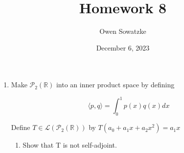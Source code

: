 \documentclass[fleqn]{article}
\title{Homework 8}
\author{Owen Sowatzke}
\date{December 6, 2023}
\makeatletter
\newcommand{\zerodisplayskip}{
	\setlength{\abovedisplayskip}{0pt}%
	\setlength{\belowdisplayskip}{0pt}%
	\setlength{\abovedisplayshortskip}{0pt}%
	\setlength{\belowdisplayshortskip}{0pt}%
	\setlength{\mathindent}{0pt}}
\newenvironment{equationCenter}{\@fleqnfalse\begin{equation*}}{\end{equation*}}
\makeatother
\begin{document}
	\offinterlineskip
	\setlength{\lineskip}{12pt}
	\zerodisplayskip
	\maketitle
	
	\begin{enumerate}[nolistsep]
		\item Make $\mathcal{P}_2(\mathbb{R})$ into an inner product space by defining
		
		\begin{equationCenter}
			\langle p, q\rangle = \int_{0}^{1}{p(x)q(x)dx}
		\end{equationCenter}
		
		Define $T \in \mathcal{L}(\mathcal{P}_2(\mathbb{R}))$ by $T(a_0 + a_1x + a_2x^2) = a_1x$
		
		\begin{enumerate}[nolistsep]
			\item Show that T is not self-adjoint.
			
		\end{enumerate}
	\end{enumerate}
\end{document}
